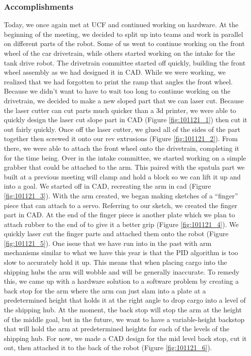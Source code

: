 \subsubsection*{Accomplishments}
Today, we once again met at UCF and continued working on hardware. At the beginning of the meeting, we decided to split up into teams and work in parallel on different parts of the robot. Some of us went to continue working on the front wheel of the car drivetrain, while others started working on the intake for the tank drive robot. 
The drivetrain committee started off quickly, building the front wheel assembly as we had designed it in CAD. While we were working, we realized that we had forgotten to print the ramp that angles the front wheel. Because we didn’t want to have to wait too long to continue working on the drivetrain, we decided to make a new sloped part that we can laser cut. Because the laser cutter can cut parts much quicker than a 3d printer, we were able to quickly design the laser cut slope part in CAD (Figure \ref{fig:101121_1}) then cut it out fairly quickly. Once off the laser cutter, we glued all of the sides of the part together then screwed it onto our rev extrusions (Figure \ref{fig:101121_2}). From there, we were able to attach the front wheel onto the drivetrain, completing it for the time being.
Over in the intake committee, we started working on a simple grabber that could be attached to the arm. This paired with the spatula part we built at a previous meeting will clamp and hold a block so we can lift it up and into a goal. We started off in CAD, recreating the arm in cad (Figure \ref{fig:101121_3}). With the arm created, we began making sketches of  a “finger” piece that can attach to a servo. Referring to our sketch, we created the finger part in CAD. At the end of the finger piece is another plate which we plan to attach rubber to the end of to give it a better grip (Figure \ref{fig:101121_4}). We quickly laser cut the finger parts and attached them onto the robot (Figure \ref{fig:101121_5}).
One issue that we have run into in the past with arm mechanisms similar to what we have this year is that the PID algorithm is too slow to accurately hold it up. This means that when placing cargo into the shipping hubs the arm will wobble and will be generally inaccurate. To remedy this, we came up with a hardware solution to a software problem by creating a back stop for the arm where the arm can just slam into a plate at a predetermined height that holds it at the right angle to drop cargo into a level of the shipping hub. At the moment, the back stop will stop the arm at the height of the middle goal, but in the future, we want to have a variable-height backstop that will hold the arm at predetermined heights for each of the levels of the shipping hub. For now, we made a CAD design for the mid level back stop, cut it out, then attached it to the back of the robot (Figure \ref{fig:101121_6}).

